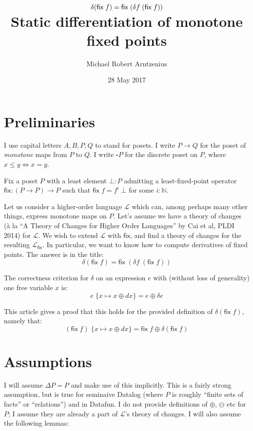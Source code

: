 \documentclass{article}
\title{$\dv(\fix\;f) = \fix\;(\dv{f} \; (\fix\;f))$
  \\\vspace{0.5em}
\large Static differentiation of monotone fixed points}
\author{Michael Robert Arntzenius}
\date{28 May 2017}
\newcommand{\ms}[1]{\ensuremath{\mathsf{#1}}}
\newcommand{\mc}[1]{\ensuremath{\mathcal{#1}}}
\newcommand{\N}{\mathbb{N}}
\newcommand{\sub}[1]{\;\{{#1}\}}
\newcommand{\Disc}[1]{\square{#1}}
\theoremstyle{definition}
\newcommand{\fix}{\ms{fix}}
\newcommand{\dv}{\delta}
\begin{document}
\maketitle

\section{Preliminaries}

I use capital letters $A, B, P, Q$ to stand for posets. I write $P \to Q$ for
the poset of \emph{monotone} maps from $P$ to $Q$. I write $\Disc{P}$ for the
discrete poset on $P$, where $x \le y \iff x = y$.

Fix a poset $P$ with a least element $\bot : P$ admitting a least-fixed-point
operator $\fix : (P \to P) \to P$ such that $\fix\;f = f^i\;\bot$ for some $i :
\N$.

Let us consider a higher-order language $\mc{L}$ which can, among perhaps many
other things, express monotone maps on $P$. Let's assume we have a theory of
changes (\`a la ``A Theory of Changes for Higher Order Languages'' by Cai et al,
PLDI 2014) for $\mc{L}$. We wish to extend $\mc{L}$ with $\fix$, and find a
theory of changes for the resulting $\mc{L}_\fix$. In particular, we want to
know how to compute derivatives of fixed points. The answer is in the title:
\[ \dv(\fix\;f) = \fix\;(\dv{f} \; (\fix\;f)) \]

The correctness criterion for $\dv$ on an expression $e$ with (without loss of
generality) one free variable $x$ is:
\begin{equation}
  e \sub{x \mapsto x \oplus dx} = e \oplus \dv e
  \label{eqn:correctness}
\end{equation}

This article gives a proof that this holds for the provided definition of
$\dv(\fix\;f)$, namely that:
\[ (\fix\;f) \sub{x \mapsto x \oplus dx} = \fix\;f \oplus \dv(\fix\;f) \]


\section{Assumptions}

I will assume $\Delta P = P$ and make use of this implicitly. This is a fairly
strong assumption, but is true for seminaive Datalog (where $P$ is roughly
``finite sets of facts'' or ``relations'') and in Datafun. I do not provide
definitions of $\oplus$, $\ominus$ etc for $P$; I assume they are already a part
of $\mc{L}$'s theory of changes. I will also assume the following lemmas:
\end{document}
